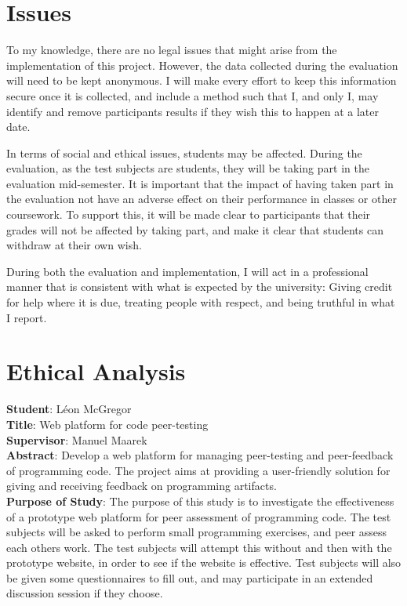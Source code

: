 \documentclass[a4paper,11pt]{report}
\begin{document}
\section{Issues}
To my knowledge, there are no legal issues that might arise from the implementation of this project. However, the data collected during the evaluation will need to be kept anonymous. I will make every effort to keep this information secure once it is collected, and include a method such that I, and only I, may identify and remove participants results if they wish this to happen at a later date.\par
In terms of social and ethical issues, students may be affected. During the evaluation, as the test subjects are students, they will be taking part in the evaluation mid-semester. It is important that the impact of having taken part in the evaluation not have an adverse effect on their performance in classes or other coursework. To support this, it will be made clear to participants that their grades will not be affected by taking part, and make it clear that students can withdraw at their own wish.\par
During both the evaluation and implementation, I will act in a professional manner that is consistent with what is expected by the university: Giving credit for help where it is due, treating people with respect, and being truthful in what I report.

\singlespacing
\printbibliography

\begin{landscape}

\end{landscape}

\section*{Ethical Analysis}
\textbf{Student}: L\'eon McGregor\\
\textbf{Title}: Web platform for code peer-testing\\
\textbf{Supervisor}: Manuel Maarek\\
\textbf{Abstract}: Develop a web platform for managing peer-testing and peer-feedback of programming code. The project aims at providing a user-friendly solution for giving and receiving feedback on programming artifacts.\\
\textbf{Purpose of Study}: The purpose of this study is to investigate the effectiveness of a prototype web platform for peer assessment of programming code. The test subjects will be asked to perform small programming exercises, and peer assess each others work. The test subjects will attempt this without and then with the prototype website, in order to see if the website is effective. Test subjects will also be given some questionnaires to fill out, and may participate in an extended discussion session if they choose.
\end{document}
